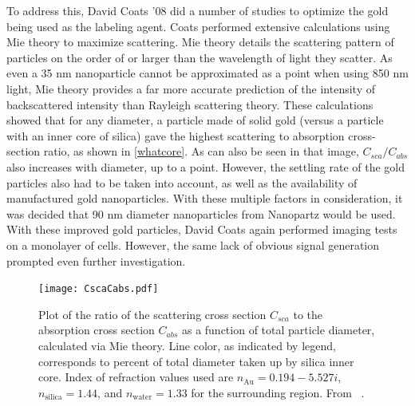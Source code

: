 To address this, David Coats '08 did a number of studies to optimize the gold being used as the labeling agent. Coats performed extensive calculations using Mie theory to maximize scattering. Mie theory details the scattering pattern of particles on the order of or larger than the wavelength of light they scatter. As even a 35 nm nanoparticle cannot be approximated as a point when using 850 nm light, Mie theory provides a far more accurate prediction of the intensity of backscattered intensity than Rayleigh scattering theory. These calculations showed that for any diameter, a particle made of solid gold (versus a particle with an inner core of silica) gave the highest scattering to absorption cross-section ratio, as shown in \autoref{whatcore}. As can also be seen in that image, $C_{sca}/C_{abs}$ also increases with diameter, up to a point. However, the settling rate of the gold particles also had to be taken into account, as well as the availability of manufactured gold nanoparticles. With these multiple factors in consideration, it was decided that 90 nm diameter nanoparticles from Nanopartz would be used. With these improved gold particles, David Coats again performed imaging tests on a monolayer of cells. However, the same lack of obvious signal generation prompted even further investigation.

\begin{figure}[htbp]
\centering
\texttt{[image: CscaCabs.pdf]}
\caption{Plot of the ratio of the scattering cross section $C_{sca}$ to the absorption cross section $C_{abs}$ as a function of total particle diameter, calculated via Mie theory. Line color, as indicated by legend, corresponds to percent of total diameter taken up by silica inner core. Index of refraction values used are $n_{\mathrm{Au}}=0.194 - 5.527i$, $n_{\mathrm{silica}}=1.44$, and $n_{\mathrm{water}}=1.33$ for the surrounding region. From ~\citep{coats}.}
\label{whatcore}
\end{figure}



